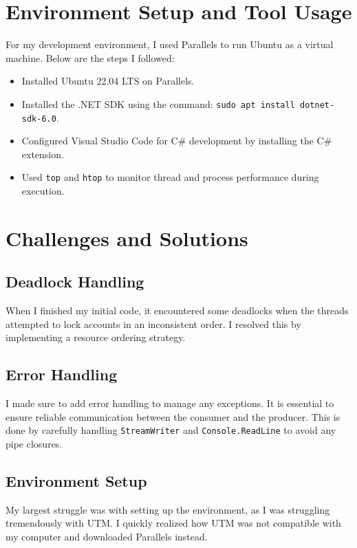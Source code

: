 \documentclass{article}
\begin{document}
\section*{Environment Setup and Tool Usage}
For my development environment, I used Parallels to run Ubuntu as a virtual machine. Below are the steps I followed:
\begin{itemize}
    \item Installed Ubuntu 22.04 LTS on Parallels.
    \item Installed the .NET SDK using the command: \texttt{sudo apt install dotnet-sdk-6.0}.
    \item Configured Visual Studio Code for C\# development by installing the C\# extension.
    \item Used \texttt{top} and \texttt{htop} to monitor thread and process performance during execution.
\end{itemize}

\section*{Challenges and Solutions}

\subsection*{Deadlock Handling}

When I finished my initial code, it encountered some deadlocks when the threads attempted to lock accounts in an inconsistent order. I resolved this by implementing a resource ordering strategy.

\subsection*{Error Handling}

I made sure to add error handling to manage any exceptions. It is essential to ensure reliable communication between the consumer and the producer. This is done by carefully handling \texttt{StreamWriter} and \texttt{Console.ReadLine} to avoid any pipe closures.

\subsection*{Environment Setup}

My largest struggle was with setting up the environment, as I was struggling tremendously with UTM. I quickly realized how UTM was not compatible with my computer and downloaded Parallels instead.
\end{document}
